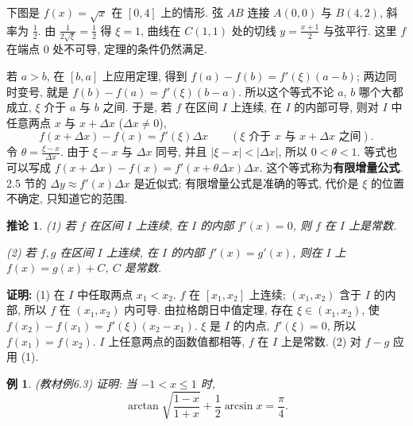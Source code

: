 \documentclass[UTF8,openany]{ctexbook}
\theoremstyle{chinesetextbook}
\newtheorem{example}{例}[section]
\newenvironment{cnproof}{\par\indent\textbf{证明:} \ignorespaces}{\par}
\newtheorem*{corollarysingle}{推论}
\begin{document}
下图是 $f(x)=\sqrt x$ 在 $[0,4]$ 上的情形. 弦 $AB$ 连接 $A(0,0)$ 与 $B(4,2)$, 斜率为 $\displaystyle\frac12$. 由 $\displaystyle\frac1{2\sqrt\xi}=\frac12$ 得 $\xi=1$, 曲线在 $C(1,1)$ 处的切线 $\displaystyle y=\frac{x+1}2$ 与弦平行. 这里 $f$ 在端点 $0$ 处不可导, 定理的条件仍然满足.
\begin{center}
\end{center}
若 $a>b$, 在 $[b,a]$ 上应用定理, 得到 $f(a)-f(b)=f'(\xi)(a-b)$; 两边同时变号, 就是 $f(b)-f(a)=f'(\xi)(b-a)$. 所以这个等式不论 $a$, $b$ 哪个大都成立, $\xi$ 介于 $a$ 与 $b$ 之间. 于是, 若 $f$ 在区间 $I$ 上连续, 在 $I$ 的内部可导, 则对 $I$ 中任意两点 $x$ 与 $x+\Delta x$ ($\Delta x\ne0$),
\[
f(x+\Delta x)-f(x)=f'(\xi)\Delta x\qquad(\xi\text{ 介于 }x\text{ 与 }x+\Delta x\text{ 之间}).
\]
令 $\displaystyle\theta=\frac{\xi-x}{\Delta x}$. 由于 $\xi-x$ 与 $\Delta x$ 同号, 并且 $|\xi-x|<|\Delta x|$, 所以 $0<\theta<1$. 等式也可以写成 $f(x+\Delta x)-f(x)=f'(x+\theta\Delta x)\Delta x$. 这个等式称为\textbf{有限增量公式}. 2.5 节的 $\Delta y\approx f'(x)\Delta x$ 是近似式; 有限增量公式是准确的等式, 代价是 $\xi$ 的位置不确定, 只知道它的范围.
\begin{corollarysingle}
\textup{(1)} 若 $f$ 在区间 $I$ 上连续, 在 $I$ 的内部 $f'(x)=0$, 则 $f$ 在 $I$ 上是常数.

\textup{(2)} 若 $f,g$ 在区间 $I$ 上连续, 在 $I$ 的内部 $f'(x)=g'(x)$, 则在 $I$ 上 $f(x)=g(x)+C$, $C$ 是常数.
\end{corollarysingle}
\begin{cnproof}
(1) 在 $I$ 中任取两点 $x_1<x_2$. $f$ 在 $[x_1,x_2]$ 上连续; $(x_1,x_2)$ 含于 $I$ 的内部, 所以 $f$ 在 $(x_1,x_2)$ 内可导. 由拉格朗日中值定理, 存在 $\xi\in(x_1,x_2)$, 使 $f(x_2)-f(x_1)=f'(\xi)(x_2-x_1)$. $\xi$ 是 $I$ 的内点, $f'(\xi)=0$, 所以 $f(x_1)=f(x_2)$. $I$ 上任意两点的函数值都相等, $f$ 在 $I$ 上是常数. (2) 对 $f-g$ 应用 (1).
\end{cnproof}
\begin{example}\label{ex:c2-6-3}
\textnormal{(教材例6.3)} 证明: 当 $-1<x\le1$ 时,
\[
\arctan\sqrt{\frac{1-x}{1+x}}+\frac12\arcsin x=\frac\pi4.
\]
\end{example}
\end{document}
